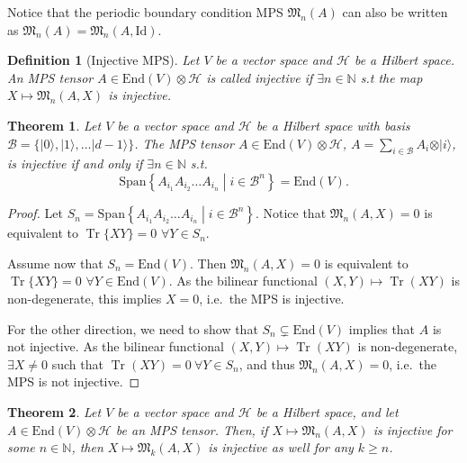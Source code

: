\documentclass{article}
\newtheorem{theorem}{Theorem}
\newtheorem{definition}{Definition}
\newcommand{\tr}{\operatorname{Tr}}
\newcommand{\id}{\mathrm{Id}}
\newcommand{\End}{\mathrm{End}}
\newcommand{\ket}[1]{\vert #1 \rangle}
\newcommand{\Span}{\mathrm{Span}}
\begin{document}
Notice that the periodic boundary condition MPS $\mathfrak{M}_n(A)$ can also be written as $\mathfrak{M}_n(A) = \mathfrak{M}_n(A,\id)$.

\begin{definition}[Injective MPS]
  Let $V$ be a vector space and $\mathcal{H}$ be a Hilbert space. An MPS tensor $A\in \End(V)\otimes \mathcal{H}$ is called \emph{injective} if $\exists n\in\mathbb{N}$ s.t the map $X\mapsto \mathfrak{M}_n(A,X)$ is injective.
\end{definition}

\begin{theorem}\label{thm:injectivity_equivalent}
  Let $V$ be a vector space and $\mathcal{H}$ be a Hilbert space with basis $\mathcal{B} = \{\ket{0},\ket{1},\dots \ket{d-1}\}$. The MPS tensor $A\in \End(V)\otimes \mathcal{H}$, $A = \sum_{i\in \mathcal{B}} A_i \otimes \ket{i}$, is injective if and only if $\exists n\in \mathbb{N}$ s.t.
  \begin{equation*}
  	\Span\left\{A_{i_1} A_{i_2} \dots A_{i_n} \middle| i\in \mathcal{B}^n \right\} = \End(V).
  \end{equation*}
\end{theorem}

\begin{proof}
	Let $S_n = \Span\left\{A_{i_1} A_{i_2} \dots A_{i_n} \middle| i\in \mathcal{B}^n \right\}$. Notice that $\mathfrak{M}_n(A,X)=0$ is equivalent to $\tr\{XY\} = 0$ $\forall Y\in S_n$.
  
  Assume now that $S_n = \End(V)$. Then $\mathfrak{M}_n(A,X) = 0$ is equivalent to $\tr \{XY\} = 0 $ $\forall Y\in \End(V)$. As the bilinear functional $(X,Y)\mapsto \tr (XY)$ is non-degenerate, this implies $X=0$, i.e.\ the MPS is injective.
  
  For the other direction, we need to show that $S_n\subsetneq \End(V)$ implies that $A$ is not injective. As the bilinear functional $(X,Y)\mapsto \tr (XY)$ is non-degenerate, $\exists X\neq 0$ such that $\tr (XY) = 0 \ \forall Y\in S_n$, and thus $\mathfrak{M}_n(A,X) = 0$, i.e.\ the MPS is not injective.
\end{proof}


\begin{theorem}
  Let $V$ be a vector space and $\mathcal{H}$ be a Hilbert space, and let $A\in \End(V)\otimes \mathcal{H}$ be an MPS tensor. Then, if $X\mapsto\mathfrak{M}_n(A,X)$ is injective for some $n\in\mathbb{N}$, then $X \mapsto \mathfrak{M}_k(A,X)$ is injective as well for any $k\geq n$.
\end{theorem}
\end{document}
